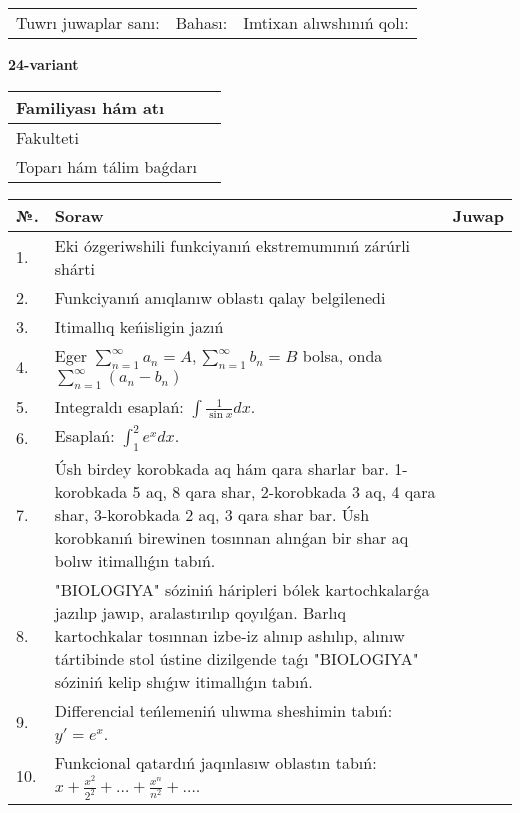 \documentclass{article}
\begin{document}
\vspace{1cm}

\begin{tabular}{ c c c }
Tuwrı juwaplar sanı: \underline{\hspace{2cm}} & Bahası: \underline{\hspace{2cm}} & Imtixan alıwshınıń qolı: \underline{\hspace{2cm}} \\
\end{tabular}

\newpage

\begin{center}\textbf{24-variant}\end{center}

\bgroup
\def\arraystretch{1.5}
\begin{tabular}{ |m{6cm}|m{10cm}| }
  \hline
  Familiyası hám atı & \\
  \hline
  Fakulteti &\\
  \hline
  Toparı hám tálim baǵdarı & \\
  \hline
\end{tabular}
\egroup

\vspace{0.5cm}

\bgroup
\def\arraystretch{2}
\begin{tabular}{ |l|m{8cm}|m{7cm}| }
  \hline
  №. & Soraw & Juwap \\
  \hline
  1. & Eki ózgeriwshili funkciyanıń ekstremumınıń zárúrli shárti &  \\
  \hline
  2. & Funkciyanıń anıqlanıw oblastı qalay belgilenedi &  \\
  \hline
  3. & Itimallıq keńisligin jazıń &  \\
  \hline
  4. & Eger $\displaystyle\sum_{n = 1}^{\infty}a_{n} = A, \sum_{n = 1}^{\infty}b_{n} = B$ bolsa, onda $\displaystyle\sum_{n = 1}^{\infty}\left( a_{n} - b_{n} \right)$ &  \\
  \hline
  5. & Integraldı esaplań: $\displaystyle\int {\frac{1}{\sin x}dx} $. &  \\
  \hline
  6. & Esaplań: $\displaystyle\int_{1}^{2}{e^{x}dx}$. &  \\
  \hline
  7. & Úsh birdey korobkada aq hám qara sharlar bar. 1-korobkada 5 aq, 8 qara shar, 2-korobkada 3 aq, 4 qara shar, 3-korobkada 2 aq, 3 qara shar bar. Úsh korobkanıń birewinen tosınnan alınǵan bir shar aq bolıw itimallıǵın tabıń. &  \\
  \hline
  8. & "BIOLOGIYA" sóziniń háripleri bólek kartochkalarǵa jazılıp jawıp, aralastırılıp qoyılǵan. Barlıq kartochkalar tosınnan izbe-iz alınıp ashılıp, alınıw tártibinde stol ústine dizilgende taǵı "BIOLOGIYA" sóziniń kelip shıǵıw itimallıǵın tabıń. &  \\
  \hline
  9. & Differencial teńlemeniń ulıwma sheshimin tabıń: $y'=e^{x}$. &  \\
  \hline
  10. & Funkcional qatardıń jaqınlasıw oblastın tabıń: $\displaystyle x + \frac{x^{2}}{2^{2}} + \ldots + \frac{x^{n}}{n^{2}} + \ldots$. &  \\
  \hline
\end{tabular}
\egroup
\end{document}
